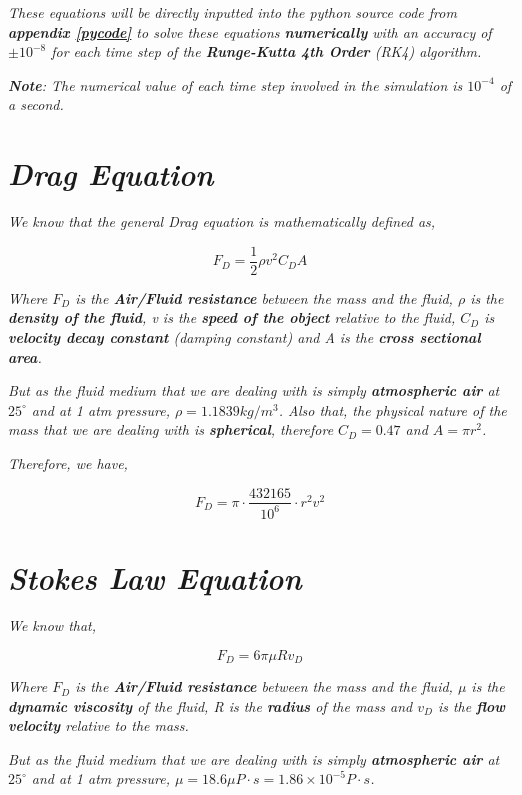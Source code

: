     \textit{These equations will be directly inputted into the python source code from \textbf{appendix \ref{pycode}} to solve these equations \textbf{numerically} with an accuracy of $\pm 10^{-8}$ for each time step of the \textbf{Runge-Kutta 4th Order} (RK4) algorithm.}
           
	\textit{\textbf{Note}: The numerical value of each time step involved in the simulation is $10^{-4}$ of a second.}
           
\section{\textit{Drag Equation}}
            
    \textit{We know that the general Drag equation is mathematically defined as,}
            
        $$F_D = \frac{1}{2}\rho v^2C_DA$$
           
    \textit{Where $F_D$ is the \textbf{Air/Fluid resistance} between the mass and the fluid, $\rho$ is the \textbf{density of the fluid}, v is the \textbf{speed of the object} relative to the fluid, $C_D$ is \textbf{velocity decay constant} (damping constant) and A is the \textbf{cross sectional area}.}
            
    \textit{But as the fluid medium that we are dealing with is simply \textbf{atmospheric air} at $25^\circ$ and at 1 atm pressure, $\rho = 1.1839 kg/m^3$. Also that, the physical nature of the mass that we are dealing with is \textbf{spherical}, therefore $C_D = 0.47$ and $A = \pi r^2$.}
            
    \textit{Therefore, we have,}
            
        $$F_D = \pi\cdot\frac{432165}{10^{6}}\cdot r^2v^2$$
            
\section{\textit{Stokes Law Equation}}
            
    \textit{We know that,}
            
        $$F_D = 6\pi\mu Rv_D$$
            
    \textit{Where $F_D$ is the \textbf{Air/Fluid resistance} between the mass and the fluid, $\mu$ is the \textbf{dynamic viscosity} of the fluid, R is the \textbf{radius} of the mass and $v_D$ is the \textbf{flow velocity} relative to the mass.}
            
    \textit{But as the fluid medium that we are dealing with is simply \textbf{atmospheric air} at $25^\circ$ and at 1 atm pressure, $\mu = 18.6 \mu P\cdot s = 1.86 \times 10^{-5} P\cdot s$.}
            
